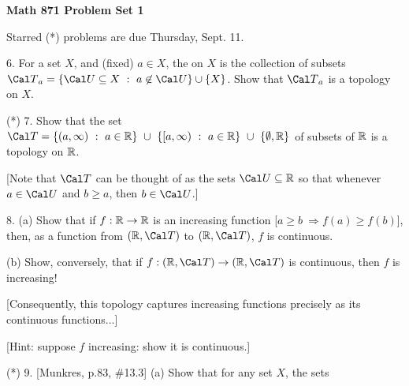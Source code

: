 


\def\ctln{\centerline}
\def\msk{\medskip}
\def\bsk{\bigskip}
\def\ssk{\smallskip}
\def\ra{\rightarrow}

\UseAMSsymbols

\ctln{\bf Math 871 Problem Set 1}

\msk

Starred (*) problems are due Thursday, Sept. 11.

\bsk

\item{6.} For a set $X$, and (fixed) $a\in X$, the   
on $X$ is the collection of subsets ${\Cal T}_a = \{{\Cal U}\subseteq X\ :\ a\not\in{\Cal U}\}\cup\{X\}$.
Show that ${\Cal T}_a$ is a topology on $X$.

\msk

\item{(*)} 7. Show that the set 
${\Cal T} = \{(a,\infty)\ :\ a\in{\Bbb R}\}\ \cup\ \{[a,\infty)\ :\ a\in{\Bbb R}\}\ \cup\ \{\emptyset,{\Bbb R}\}$
of subsets of $\Bbb R$ is a topology on $\Bbb R$.

\ssk

\item{} [Note that ${\Cal T}$ can be thought of as the sets ${\Cal U}\subseteq{\Bbb R}$ so that whenever
$a\in{\Cal U}$ and $b\geq a$, then $b\in{\Cal U}$.]

\msk

\item{8.} (a) Show that if $f:{\Bbb R}\ra{\Bbb R}$ is an increasing function [$a\geq b\ \Rightarrow f(a)\geq f(b)$],
then, as a function from $({\Bbb R},{\Cal T})$ to $({\Bbb R},{\Cal T})$, $f$ is continuous.

\msk

\item{} (b) Show, conversely, that if  $f:({\Bbb R},{\Cal T})\ra({\Bbb R},{\Cal T})$ is continuous, then $f$ is increasing!

\item{} [Consequently, this topology captures increasing functions precisely as its continuous functions...]

\item{} [Hint: suppose $f$  increasing: show it is  continuous.]

\msk

\item{(*)} 9. [Munkres, p.83, \#13.3] (a) Show that for any set $X$, the sets

